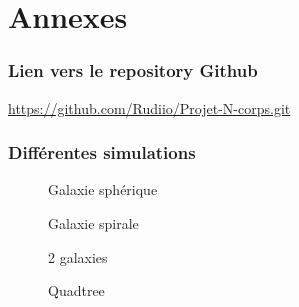 \part*{Annexes}

\makeatletter
\renewcommand{\thesection}{\@arabic\c@section}
\makeatother

\section{Lien vers le repository Github}
\url{https://github.com/Rudiio/Projet-N-corps.git}

\section{Différentes simulations}

\begin{figure}[H]
\begin{minipage}[b]{.46\linewidth}
\centering{}
\caption{Galaxie sphérique
    \label{fig12}
    }
\end{minipage} \hfill
\begin{minipage}[b]{.46\linewidth}
\centering{}
\caption{Galaxie spirale\label{fig13}}
\end{minipage}
\end{figure}

\begin{figure}[H]
\begin{minipage}[b]{.46\linewidth}
\centering{}
\caption{2 galaxies\label{fig14}}
\end{minipage} \hfill
\begin{minipage}[b]{.46\linewidth}
\centering{}
\caption{Quadtree\label{fig15}}
\end{minipage}
\end{figure}
